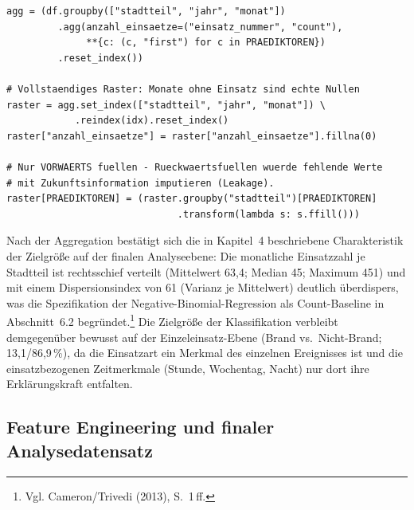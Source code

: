 \begin{lstlisting}[caption={Aggregation auf Stadtteil~$\times$~Monat mit
vollständigem Raster (Ausschnitt aus
\texttt{modellierung/aggregation.py})}, label=lst:aggregation]
agg = (df.groupby(["stadtteil", "jahr", "monat"])
         .agg(anzahl_einsaetze=("einsatz_nummer", "count"),
              **{c: (c, "first") for c in PRAEDIKTOREN})
         .reset_index())

# Vollstaendiges Raster: Monate ohne Einsatz sind echte Nullen
raster = agg.set_index(["stadtteil", "jahr", "monat"]) \
            .reindex(idx).reset_index()
raster["anzahl_einsaetze"] = raster["anzahl_einsaetze"].fillna(0)

# Nur VORWAERTS fuellen - Rueckwaertsfuellen wuerde fehlende Werte
# mit Zukunftsinformation imputieren (Leakage).
raster[PRAEDIKTOREN] = (raster.groupby("stadtteil")[PRAEDIKTOREN]
                              .transform(lambda s: s.ffill()))
\end{lstlisting}

Nach der Aggregation bestätigt sich die in Kapitel~4 beschriebene
Charakteristik der Zielgröße auf der finalen Analyseebene: Die monatliche
Einsatzzahl je Stadtteil ist rechtsschief verteilt (Mittelwert 63,4; Median
45; Maximum 451) und mit einem Dispersionsindex von 61 (Varianz je
Mittelwert) deutlich überdispers, was die Spezifikation der
Negative-Binomial-Regression als Count-Baseline in Abschnitt~6.2
begründet.\footnote{Vgl. Cameron/Trivedi (2013), S.~1\,ff.} Die Zielgröße
der Klassifikation verbleibt demgegenüber bewusst auf der
Einzeleinsatz-Ebene (Brand vs.\ Nicht-Brand; 13,1/86,9\,\%), da die
Einsatzart ein Merkmal des einzelnen Ereignisses ist und die
einsatzbezogenen Zeitmerkmale (Stunde, Wochentag, Nacht) nur dort ihre
Erklärungskraft entfalten.

\subsection{Feature Engineering und finaler Analysedatensatz}
\label{sec:feature-engineering}

